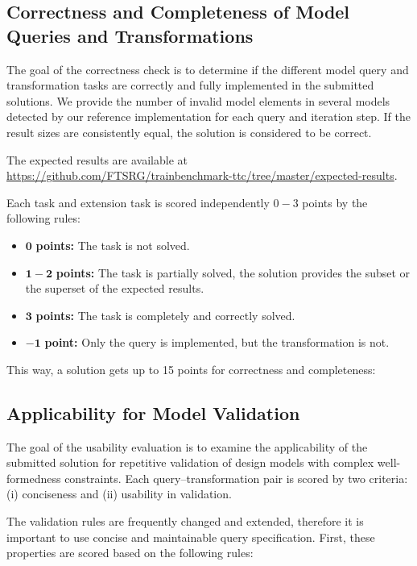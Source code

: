 \documentclass[submission,copyright,creativecommons]{eptcs}
\begin{document}
\subsection{Correctness and Completeness of Model Queries and Transformations}
The goal of the correctness check is to determine if the different model query and transformation tasks are correctly and fully implemented in the submitted solutions.
We provide the number of invalid model elements in several models detected by our reference implementation for each query and iteration step. If the result sizes are consistently equal, the solution is considered to be correct.

The expected results are available at \url{https://github.com/FTSRG/trainbenchmark-ttc/tree/master/expected-results}.

Each task and extension task is scored independently $0-3$ points by the following rules:
\begin{itemize}
  \item $\mathbf{0}$   \textbf{points:} The task is not solved.
  \item $\mathbf{1-2}$ \textbf{points:} The task is partially solved, the solution provides the subset or the superset of the expected results.
  \item $\mathbf{3}$   \textbf{points:} The task is completely and correctly solved.
  \item $\mathbf{-1}$  \textbf{point:} Only the query is implemented, but the transformation is not.
\end{itemize}

This way, a solution gets up to 15 points for correctness and completeness:

\noindent{}

\subsection{Applicability for Model Validation}

The goal of the usability evaluation is to examine the applicability of the submitted solution for repetitive validation of design models with complex well-formedness constraints. Each query--transformation pair is scored by two criteria: (i) conciseness and (ii) usability in validation.

The validation rules are frequently changed and extended, therefore it is important to use concise and maintainable query specification. First, these properties are scored based on the following rules:
\end{document}
